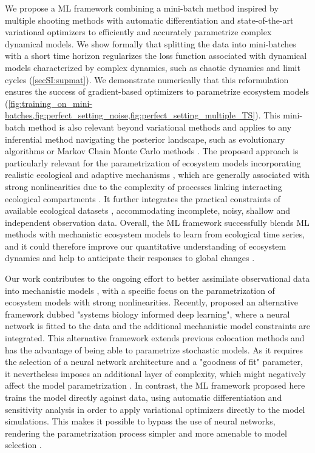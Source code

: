 We propose a ML framework combining a mini-batch method inspired by multiple shooting methods \citep{Pisarenko2004} with automatic differentiation \citep{Rackauckas2020a} and state-of-the-art variational optimizers \citep{Kingma2014} to efficiently and accurately parametrize complex dynamical models. 
% 
We show formally that splitting the data into mini-batches with a short time horizon regularizes the loss function associated with dynamical models characterized by complex dynamics, such as chaotic dynamics and limit cycles (\cref{secSI:supmat}). We demonstrate numerically that this reformulation ensures the success of gradient-based optimizers to parametrize ecosystem models (\cref{fig:training_on_mini-batches,fig:perfect_setting_noise,fig:perfect_setting_multiple_TS}).
% 
This mini-batch method is also relevant beyond variational methods and applies to any inferential method navigating the posterior landscape, such as evolutionary algorithms \citep{wilke2001evolution,Rodriguez-Fernandez2006} or Markov Chain Monte Carlo methods \citep{Lignell2013,Higgins2010,Xu2006,Fiechter2013,Rosenbaum2019}.
% 
The proposed approach is particularly relevant for the parametrization of ecosystem models incorporating realistic ecological and adaptive mechanisms \citep{Urban2016}, which are generally associated with strong nonlinearities due to the complexity of processes linking interacting ecological compartments \citep{Bjornstad2001,Hastings1993,Huisman1999,Beninca2008}. It further integrates the practical constraints of available ecological datasets \citep{Dornelas2018}, accommodating incomplete, noisy, shallow and independent observation data.
Overall, the ML framework successfully blends ML methods with mechanistic ecosystem models to learn from ecological time series, and it could therefore improve our quantitative understanding of ecosystem dynamics and help to anticipate their responses to global changes \citep{Urban2016}.

Our work contributes to the ongoing effort to better assimilate observational data into mechanistic models \citep{Schartau2017,Raissi2019,Kashinath2021}, with a specific focus on the parametrization of ecosystem models with strong nonlinearities.
%
Recently, \citep{Yazdani2020} proposed an alternative framework dubbed "systems biology informed deep learning", where a neural network is fitted to the data and the additional mechanistic model constraints are integrated. This alternative framework extends previous colocation methods \citep{Ramsay2007,Cao2008} and has the advantage of being able to parametrize stochastic models. As it requires the selection of a neural network architecture and a "goodness of fit" parameter, it nevertheless imposes an additional layer of complexity, which might negatively affect the model parametrization  \citep{Yazdani2020}. 
% 
In contrast, the ML framework proposed here trains the model directly against data, using automatic differentiation and sensitivity analysis in order to apply variational optimizers directly to the model simulations. This makes it possible to bypass the use of neural networks, rendering the parametrization process simpler and more amenable to model selection \citep{Ramsay2007}. 
% 


